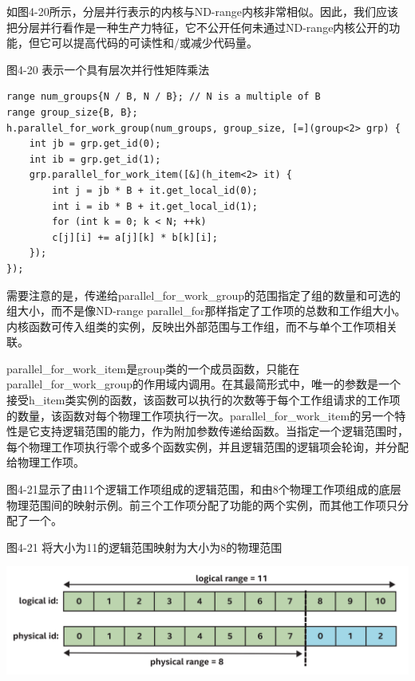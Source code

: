 如图4-20所示，分层并行表示的内核与ND-range内核非常相似。因此，我们应该把分层并行看作是一种生产力特征，它不公开任何未通过ND-range内核公开的功能，但它可以提高代码的可读性和/或减少代码量。\par

\hspace*{\fill} \par %
图4-20 表示一个具有层次并行性矩阵乘法
\begin{lstlisting}[caption={}]
range num_groups{N / B, N / B}; // N is a multiple of B
range group_size{B, B};
h.parallel_for_work_group(num_groups, group_size, [=](group<2> grp) {
	int jb = grp.get_id(0);
	int ib = grp.get_id(1);
	grp.parallel_for_work_item([&](h_item<2> it) {
		int j = jb * B + it.get_local_id(0);
		int i = ib * B + it.get_local_id(1);
		for (int k = 0; k < N; ++k)
		c[j][i] += a[j][k] * b[k][i];
	});
});
\end{lstlisting}

需要注意的是，传递给parallel\_for\_work\_group的范围指定了组的数量和可选的组大小，而不是像ND-range parallel\_for那样指定了工作项的总数和工作组大小。内核函数可传入组类的实例，反映出外部范围与工作组，而不与单个工作项相关联。\par

parallel\_for\_work\_item是group类的一个成员函数，只能在parallel\_for\_work\_group的作用域内调用。在其最简形式中，唯一的参数是一个接受h\_item类实例的函数，该函数可以执行的次数等于每个工作组请求的工作项的数量，该函数对每个物理工作项执行一次。parallel\_for\_work\_item的另一个特性是它支持逻辑范围的能力，作为附加参数传递给函数。当指定一个逻辑范围时，每个物理工作项执行零个或多个函数实例，并且逻辑范围的逻辑项会轮询，并分配给物理工作项。\par

图4-21显示了由11个逻辑工作项组成的逻辑范围，和由8个物理工作项组成的底层物理范围间的映射示例。前三个工作项分配了功能的两个实例，而其他工作项只分配了一个。\par

\hspace*{\fill} \par %
图4-21 将大小为11的逻辑范围映射为大小为8的物理范围
\begin{center}
	\includegraphics[width=1.\textwidth]{content/chapter-4/images/6}
\end{center}

